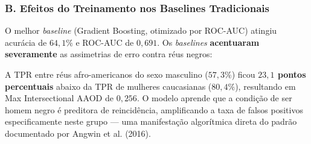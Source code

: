 \subsubsection{B. Efeitos do Treinamento nos Baselines Tradicionais}

O melhor \textit{baseline} (Gradient Boosting, otimizado por ROC-AUC) atingiu acurácia de $64,1\%$ e ROC-AUC de $0,691$. Os \textit{baselines} \textbf{acentuaram severamente} as assimetrias de erro contra réus negros:

\begin{table}[H]
    \centering
    \caption{Métricas de equidade interseccional pós-treino por subgrupo (COMPAS, GradientBoosting --- melhor baseline, média entre 3 folds externos).}
    \vspace{2mm}
    \label{tab:compas_subgroup_posttrain}
\end{table}

A TPR entre réus afro-americanos do sexo masculino ($57,3\%$) ficou \textbf{$23,1$ pontos percentuais} abaixo da TPR de mulheres caucasianas ($80,4\%$), resultando em Max Intersectional AAOD de $0,256$. O modelo aprende que a condição de ser homem negro é preditora de reincidência, amplificando a taxa de falsos positivos especificamente neste grupo --- uma manifestação algorítmica direta do padrão documentado por Angwin et al. (2016).

